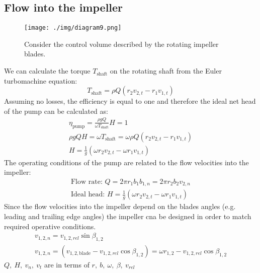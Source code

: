 \subsection{Flow into the impeller}
\begin{figure}[H]
  \centering
  \texttt{[image: ./img/diagram9.png]}
  \caption{Consider the control volume described by the rotating impeller blades.}
\end{figure}
We can calculate the torque $T_{\textrm{shaft}}$ on the rotating shaft from the Euler turbomachine equation:
\begin{equation}
  T_{\textrm{shaft}} = \rho Q (r_2 v_{2,t} - r_1 v_{1,t})
\end{equation}
Assuming no losses, the efficiency is equal to one and therefore the ideal net head of the pump can be calculated as:
\begin{gather}
  \eta_{\textrm{pump}} = \frac{\rho g Q}{\omega T_{\textrm{shaft}}}H = 1\\
  \rho g QH = \omega T_{\textrm{shaft}} = \omega\rho Q (r_2v_{2,t} - r_1 v_{1,t})\\
  H = \frac{1}{g}(\omega r_2 v_{2,t} - \omega r_1 v_{1,t})
\end{gather}
The operating conditions of the pump are related to the flow velocities into the impeller:
\begin{gather}
  \textrm{Flow rate: } Q = 2\pi r_1 b_1 b_{1,n} = 2\pi r_2 b_2 v_{2,n}\\
  \textrm{Ideal head: } H = \frac{1}{g}(\omega r_2 v_{2,t} - \omega r_1 v_{1,t})
\end{gather}
Since the flow velocities into the impeller depend on the blades angles (e.g. leading and trailing edge angles) the impeller cna be designed in order to match required operative conditions.
\begin{gather}
  v_{1,2,n} = v_{1,2,rel} \sin{\beta_{1,2}}\\
  v_{1,2,n} = (v_{1,2,\textrm{blade}} - v_{1,2,rel} \cos{\beta_{1,2}}) = \omega r_{1,2} - v_{1,2,rel} \cos{\beta_{1,2}}
\end{gather}
$Q, \ H, \ v_n, \ v_t$ are in terms of $r, \ b, \ \omega, \ \beta, \ v_{rel}$